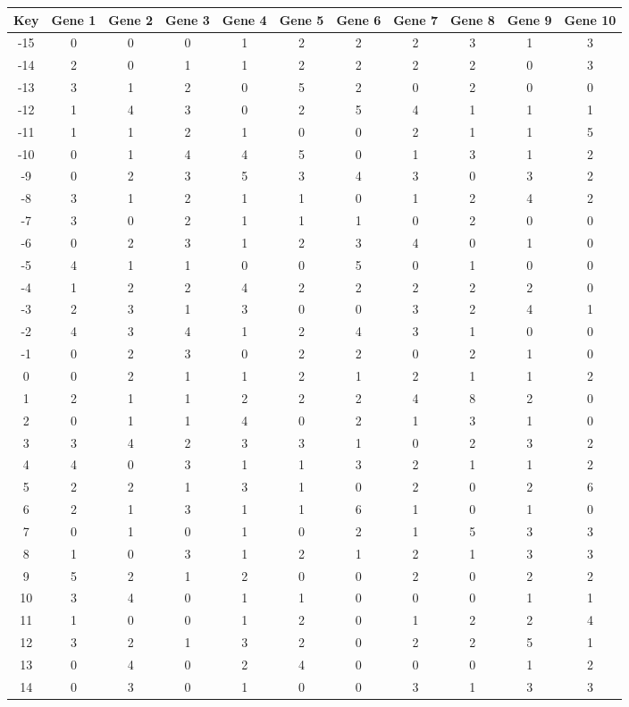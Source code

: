 \begin{tabular}{|c|c|c|c|c|c|c|c|c|c|c|}
\hline
Key & Gene 1 & Gene 2 & Gene 3 & Gene 4 & Gene 5 & Gene 6 & Gene 7 & Gene 8 & Gene 9 & Gene 10 \\
\hline
-15 & 0 & 0 & 0 & 1 & 2 & 2 & 2 & 3 & 1 & 3 \\
-14 & 2 & 0 & 1 & 1 & 2 & 2 & 2 & 2 & 0 & 3 \\
-13 & 3 & 1 & 2 & 0 & 5 & 2 & 0 & 2 & 0 & 0 \\
-12 & 1 & 4 & 3 & 0 & 2 & 5 & 4 & 1 & 1 & 1 \\
-11 & 1 & 1 & 2 & 1 & 0 & 0 & 2 & 1 & 1 & 5 \\
-10 & 0 & 1 & 4 & 4 & 5 & 0 & 1 & 3 & 1 & 2 \\
-9 & 0 & 2 & 3 & 5 & 3 & 4 & 3 & 0 & 3 & 2 \\
-8 & 3 & 1 & 2 & 1 & 1 & 0 & 1 & 2 & 4 & 2 \\
-7 & 3 & 0 & 2 & 1 & 1 & 1 & 0 & 2 & 0 & 0 \\
-6 & 0 & 2 & 3 & 1 & 2 & 3 & 4 & 0 & 1 & 0 \\
-5 & 4 & 1 & 1 & 0 & 0 & 5 & 0 & 1 & 0 & 0 \\
-4 & 1 & 2 & 2 & 4 & 2 & 2 & 2 & 2 & 2 & 0 \\
-3 & 2 & 3 & 1 & 3 & 0 & 0 & 3 & 2 & 4 & 1 \\
-2 & 4 & 3 & 4 & 1 & 2 & 4 & 3 & 1 & 0 & 0 \\
-1 & 0 & 2 & 3 & 0 & 2 & 2 & 0 & 2 & 1 & 0 \\
0 & 0 & 2 & 1 & 1 & 2 & 1 & 2 & 1 & 1 & 2 \\
1 & 2 & 1 & 1 & 2 & 2 & 2 & 4 & 8 & 2 & 0 \\
2 & 0 & 1 & 1 & 4 & 0 & 2 & 1 & 3 & 1 & 0 \\
3 & 3 & 4 & 2 & 3 & 3 & 1 & 0 & 2 & 3 & 2 \\
4 & 4 & 0 & 3 & 1 & 1 & 3 & 2 & 1 & 1 & 2 \\
5 & 2 & 2 & 1 & 3 & 1 & 0 & 2 & 0 & 2 & 6 \\
6 & 2 & 1 & 3 & 1 & 1 & 6 & 1 & 0 & 1 & 0 \\
7 & 0 & 1 & 0 & 1 & 0 & 2 & 1 & 5 & 3 & 3 \\
8 & 1 & 0 & 3 & 1 & 2 & 1 & 2 & 1 & 3 & 3 \\
9 & 5 & 2 & 1 & 2 & 0 & 0 & 2 & 0 & 2 & 2 \\
10 & 3 & 4 & 0 & 1 & 1 & 0 & 0 & 0 & 1 & 1 \\
11 & 1 & 0 & 0 & 1 & 2 & 0 & 1 & 2 & 2 & 4 \\
12 & 3 & 2 & 1 & 3 & 2 & 0 & 2 & 2 & 5 & 1 \\
13 & 0 & 4 & 0 & 2 & 4 & 0 & 0 & 0 & 1 & 2 \\
14 & 0 & 3 & 0 & 1 & 0 & 0 & 3 & 1 & 3 & 3 \\
\hline
\end{tabular}
